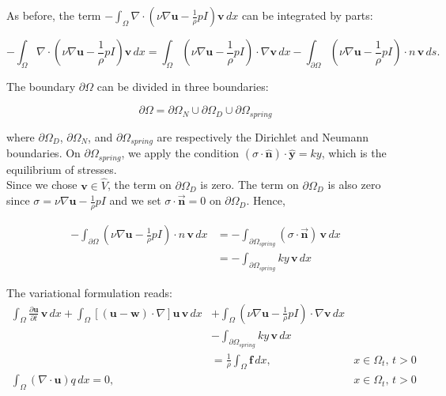 \documentclass[11pt,a4paper,titlepage]{report}
\begin{document}
As before, the term $- \int_{\Omega} \nabla \cdot (\nu \nabla \mathbf{u} -   \frac{1}{\rho}  pI)\mathbf{v} \, dx$ can be integrated by parts:

\[
- \int_{\Omega} \nabla \cdot (\nu \nabla \mathbf{u} -  \frac{1}{\rho} pI)\mathbf{v} \, dx =  \int_{\Omega} (\nu \nabla \mathbf{u} -  \frac{1}{\rho}  pI) \cdot \nabla \mathbf{v} \, dx - \int_{\partial \Omega} (\nu \nabla \mathbf{u} -  \frac{1}{\rho}  pI) \cdot n \, \mathbf{v} \, ds.
\]

The boundary $\partial \Omega$ can be divided in three boundaries:

\[
\partial \Omega = \partial \Omega_{N} \cup \partial \Omega_{D} \cup \partial \Omega_{spring}
\]

where $\partial \Omega_D$, $\partial \Omega_N$, and $\partial \Omega_{spring}$ are respectively the Dirichlet and Neumann boundaries. On $\partial \Omega_{spring}$, we apply the condition $(\sigma \cdot \hat{\mathbf{n}}) \cdot \mathbf{\hat{y}} = ky$, which is the equilibrium of stresses. \\
Since we chose $\mathbf{v} \in \hat{V}$, the term on $\partial \Omega_{D}$ is zero. The term on $\partial \Omega_{D}$ is also zero since $\sigma = \nu \nabla \mathbf{u} -  \frac{1}{\rho} pI$ and we set $\sigma \cdot \vec{\mathbf{n}} = 0$ on $\partial \Omega_{D}$. Hence, 

\[
\begin{aligned}
- \int_{\partial \Omega} (\nu \nabla \mathbf{u} -  \frac{1}{\rho}  pI) \cdot n \, \mathbf{v} \, dx & =
- \int_{\partial \Omega_{spring}} (\sigma \cdot \vec{\mathbf{n}}) \, \mathbf{v} \, dx \\
& = - \int_{\partial \Omega_{spring}} ky \, \mathbf{v} \, dx 
\end{aligned}
\]

The variational formulation reads:
\[
\begin{aligned}
\int_{\Omega} \frac{\partial \mathbf{u}}{\partial t} \, \mathbf{v} \, dx 
+ \int_{\Omega} [(\mathbf{u - w}) \cdot \nabla] \mathbf{u} \, \mathbf{v} \, dx
&+ \int_{\Omega} (\nu \nabla \mathbf{u} -  \frac{1}{\rho}  pI) \cdot \nabla \mathbf{v} \, dx \\
& - \int_{\partial \Omega_{spring}} ky \, \mathbf{v} \, dx \\
& =  \frac{1}{\rho} \int_{\Omega} \mathbf{f} \, dx,  & x \in \Omega_t, \, t>0 \\
\int_{\Omega} ( \nabla \cdot \mathbf{u} ) q \, dx = 0 , & & x \in \Omega_t, \, t>0
\end{aligned}
\]
\end{document}
